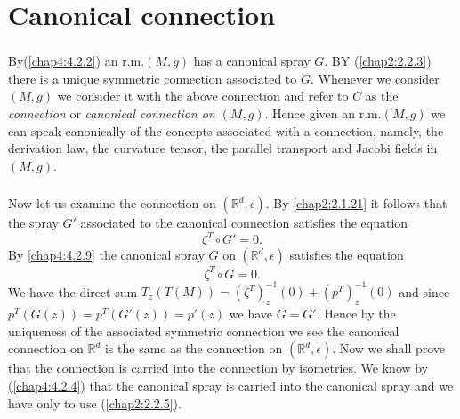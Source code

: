 \chapter{Canonical connection}\label{chap5:chap5}

\setcounter{section}{1}
\setcounter{subsection}{0}


\subsection{}\label{chap5:5.1.1}

\begin{defi*}
By\pageoriginale (\ref{chap4:4.2.2}) an r.m.\@ $(M,g)$ has a canonical
spray $G$. BY 
(\ref{chap2:2.2.3}) there is a unique symmetric connection associated to
$G$. Whenever we consider $(M,g)$ we consider it with the above
connection and refer to $C$ as the {\em connection} or {\em canonical
  connection on} $(M,g)$. Hence given an r.m.\@ $(M,g)$ we can speak
canonically of the concepts associated with a connection, namely, the
derivation law, the curvature tensor, the parallel transport and
Jacobi fields in $(M,g)$.
\end{defi*}

\subsection{}\label{chap5:5.1.2}

\begin{example*}
Now let us examine the connection on $(\mathbb{R}^{d},\epsilon)$. By
\eqref{chap2:2.1.21} it follows that the spray $G'$ associated to the
canonical connection satisfies the equation
\begin{equation*}
\zeta^{T}\circ G'=0.\tag{5.1.3}\label{chap5:5.1.3}
\end{equation*}
By \eqref{chap4:4.2.9} the canonical spray $G$ on
$(\mathbb{R}^{d},\epsilon)$ satisfies the equation
\begin{equation*}
\zeta^{T}\circ G=0.\tag{5.1.4}\label{chap5:5.1.4}
\end{equation*}
We have the direct sum
$T_{z}(T(M))=(\zeta^{T})^{-1}_{z}(0)+(p^{T})^{-1}_{z}(0)$ and since
$p^{T}(G(z))=p^{T}(G'(z))=p'(z)$ we have $G=G'$. Hence by the
uniqueness of the associated symmetric connection we see the canonical
connection on $\mathbb{R}^{d}$ is the same as the connection on
$(\mathbb{R}^{d},\epsilon)$. Now we shall prove that the connection is
carried into the connection by isometries. We know by
(\ref{chap4:4.2.4}) that \pageoriginale the canonical spray is carried
into the canonical spray and we have only to use (\eqref{chap2:2.2.5}).
\end{example*}

